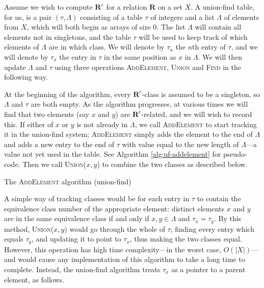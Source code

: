 Assume we wish to compute $\mathbf{R}^e$ for a relation $\mathbf{R}$ on a set
$X$.  A union-find table, for us, is a pair $(\tau, \Lambda)$ consisting of a
table $\tau$ of integers and a list $\Lambda$ of elements from $X$, which will
both begin as arrays of size $0$.  The list $\Lambda$ will contain all elements
not in singletons, and the table $\tau$ will be used to keep track of which
elements of $\Lambda$ are in which class.  We will denote by $\tau_n$ the $n$th
entry of $\tau$, and we will denote by $\tau_x$ the entry in $\tau$ in the same
position as $x$ in $\Lambda$.  We will then update $\Lambda$ and $\tau$ using
three operations \textsc{AddElement}, \textsc{Union} and \textsc{Find} in the
following way.

At the beginning of the algorithm, every $\mathbf{R}^e$-class is assumed to be a
singleton, so $\Lambda$ and $\tau$ are both empty.  As the algorithm progresses,
at various times we will find that two elements (say $x$ and $y$) are
$\mathbf{R}^e$-related, and we will wish to record this.  If either of $x$ or
$y$ is not already in $\Lambda$, we call \textsc{AddElement} to start tracking
it in the union-find system; \textsc{AddElement} simply adds the element to the
end of $\Lambda$ and adds a new entry to the end of $\tau$ with value equal to
the new length of $\Lambda$---a value not yet used in the table.  See Algorithm
\ref{alg:uf-addelement} for pseudo-code.  Then we call \textsc{Union($x,y$)} to
combine the two classes as described below.

\begin{algorithm}
\caption{The \textsc{AddElement} algorithm (union-find)}
\label{alg:uf-addelement}
  \begin{algorithmic}
    \EndProcedure
  \end{algorithmic}
\end{algorithm}

A simple way of tracking classes would be for each entry in $\tau$ to contain
the equivalence class number of the appropriate element: distinct elements $x$
and $y$ are in the same equivalence class if and only if $x,y \in \Lambda$ and
$\tau_x = \tau_y$.  By this method, \textsc{Union($x,y$)} would go through the
whole of $\tau$, finding every entry which equals $\tau_y$, and updating it to
point to $\tau_x$, thus making the two classes equal.  However, this operation
has high time complexity---in the worst case, $O(|X|)$---and would cause any
implementation of this algorithm to take a long time to complete.  Instead, the
union-find algorithm treats $\tau_x$ as a pointer to a parent element, as
follows.

